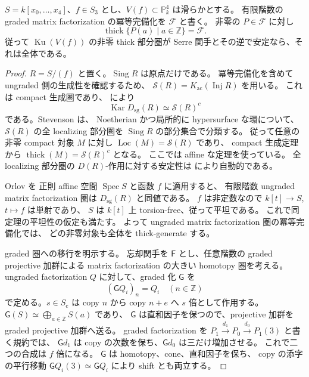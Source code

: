 \begin{lemma}[次数シフトで安定な部分圏の生成]
\label{lem:kuznetsov-graded-thick-simple}
$S=k[x_0,\ldots,x_4]$、$f\in S_3$ とし、$V(f)\subset\mathbb P^4_k$ は滑らかとする。
有限階数の graded matrix factorization の冪等完備化を $\mathcal F$ と書く。
非零の $P\in\mathcal F$ に対し
\[
 \operatorname{thick}\{P(a)\mid a\in\mathbb Z\}=\mathcal F.
\]
従って $\operatorname{Ku}(V(f))$ の非零 thick 部分圏が
Serre 関手とその逆で安定なら、それは全体である。
\end{lemma}
\begin{proof}
$R=S/(f)$ と置く。$\operatorname{Sing}R$ は原点だけである。
冪等完備化を含めて ungraded 側の生成性を確認するため、
$\mathcal S(R)=K_{\mathrm{ac}}(\operatorname{Inj}R)$ を用いる。
これは compact 生成圏であり、
\cite[Theorem~3.1(3) and Notation~3.2]{StevensonSingularityActions} により
\[
 \operatorname{Kar}D_{\mathrm{sg}}(R)\simeq\mathcal S(R)^c
\]
である。Stevenson \cite[Theorem~6.13]{StevensonSingularityActions} は、
Noetherian かつ局所的に hypersurface な環について、
$\mathcal S(R)$ の全 localizing 部分圏を $\operatorname{Sing}R$ の部分集合で分類する。
従って任意の非零 compact 対象 $M$ に対し
$\operatorname{Loc}(M)=\mathcal S(R)$ であり、
compact 生成定理 \cite[Lemma~2.2]{NeemanCompactLocalization} から
$\operatorname{thick}(M)=\mathcal S(R)^c$ となる。
ここでは affine な定理を使っている。
全 localizing 部分圏の $D(R)$-作用に対する安定性は
\cite[Lemma~3.10]{StevensonSingularityActions} により自動的である。

Orlov \cite[Theorem~3.9]{OrlovLandauGinzburg} を
正則 affine 空間 $\operatorname{Spec}S$ と函数 $f$ に適用すると、
有限階数 ungraded matrix factorization 圏は $D_{\mathrm{sg}}(R)$ と同値である。
$f$ は非定数なので $k[t]\to S$, $t\mapsto f$ は単射であり、
$S$ は $k[t]$ 上 torsion-free、従って平坦である。
これで同定理の平坦性の仮定も満たす。
よって ungraded matrix factorization 圏の冪等完備化では、
どの非零対象も全体を thick-generate する。

graded 圏への移行を明示する。
忘却関手を $\mathsf F$ とし、任意階数の graded projective 加群による
matrix factorization の大きい homotopy 圏を考える。
ungraded factorization $Q$ に対して、graded 化 $\mathsf G$ を
\[
 (\mathsf GQ_i)_n=Q_i\quad(n\in\mathbb Z)
\]
で定める。$s\in S_e$ は copy $n$ から copy $n+e$ へ $s$ 倍として作用する。
$\mathsf G(S)\simeq\bigoplus_{a\in\mathbb Z}S(a)$ であり、
$\mathsf G$ は直和因子を保つので、projective 加群を graded projective 加群へ送る。
graded factorization を
$P_1\xrightarrow{d_1}P_0\xrightarrow{d_0}P_1(3)$ と書く規約では、
$\mathsf Gd_1$ は copy の次数を保ち、$\mathsf Gd_0$ は三だけ増加させる。
これで二つの合成は $f$ 倍になる。
$\mathsf G$ は homotopy、cone、直和因子を保ち、
copy の添字の平行移動 $\mathsf GQ_i(3)\simeq\mathsf GQ_i$ により shift とも両立する。


\end{proof}
